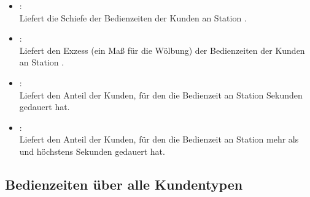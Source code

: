 \begin{itemize}
\item
{}:\\
Liefert die Schiefe der Bedienzeiten der Kunden an Station .

\item
{}:\\
Liefert den Exzess (ein Maß für die Wölbung) der Bedienzeiten der Kunden an Station .

\item
{}:\\
Liefert den Anteil der Kunden, für den die Bedienzeit an Station   Sekunden gedauert hat.

\item
{}:\\
Liefert den Anteil der Kunden, für den die Bedienzeit an Station  mehr als  und höchstens  Sekunden gedauert hat.

\end{itemize}



\subsection{Bedienzeiten über alle Kundentypen}

